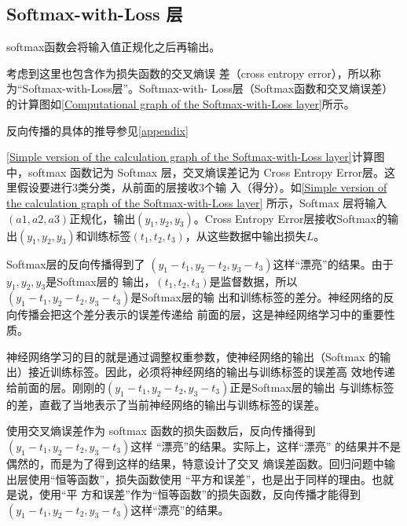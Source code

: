 

\subsection{Softmax-with-Loss 层}
softmax函数会将输入值正规化之后再输出。

考虑到这里也包含作为损失函数的交叉熵误
差（cross entropy error），所以称为“Softmax-with-Loss层”。Softmax-with-
Loss层（Softmax函数和交叉熵误差）的计算图如\autoref{Computational graph of the Softmax-with-Loss layer}所示。

反向传播的具体的推导参见\autoref{appendix}


\autoref{Simple version of the calculation graph of the Softmax-with-Loss layer}计算图中，softmax 函数记为 Softmax 层，交叉熵误差记为
Cross Entropy Error层。这里假设要进行3类分类，从前面的层接收3个输
入（得分）。如\autoref{Simple version of the calculation graph of the Softmax-with-Loss layer} 所示，Softmax 层将输入$(a1, a2, a3)$正规化，输出$(y_1,y_2, y_3)$。Cross Entropy Error层接收Softmax的输出$(y_1, y_2, y_3)$和训练标签$(t_1,t_2, t_3)$，从这些数据中输出损失$L$。

Softmax层的反向传播得到了
$(y_1 - t_1, y_2 - t_2, y_3 - t_3)$这样“漂亮”的结果。由于$y_1, y_2, y_3$是Softmax层的
输出，$(t_1, t_2, t_3)$是监督数据，所以$(y_1 - t_1, y_2 - t_2, y_3 - t_3)$是Softmax层的输
出和训练标签的差分。神经网络的反向传播会把这个差分表示的误差传递给
前面的层，这是神经网络学习中的重要性质。

神经网络学习的目的就是通过调整权重参数，使神经网络的输出（Softmax
的输出）接近训练标签。因此，必须将神经网络的输出与训练标签的误差高
效地传递给前面的层。刚刚的$(y_1 - t_1, y_2 - t_2, y_3 - t_3)$正是Softmax层的输出
与训练标签的差，直截了当地表示了当前神经网络的输出与训练标签的误差。

\begin{tcolorbox}[title=\textbf{好的损失函数的意义}]
    使用交叉熵误差作为 softmax 函数的损失函数后，反向传播得到
    $(y_1 - t_1, y_2 - t_2, y_3 - t_3)$这样 “漂亮”的结果。实际上，这样“漂亮”
    的结果并不是偶然的，而是为了得到这样的结果，特意设计了交叉
    熵误差函数。回归问题中输出层使用“恒等函数”，损失函数使用
    “平方和误差”，也是出于同样的理由。也就是说，使用“平
    方和误差”作为“恒等函数”的损失函数，反向传播才能得到$(y_1 - t_1, y_2 - t_2, y_3 - t_3)$这样“漂亮”的结果。
\end{tcolorbox}

